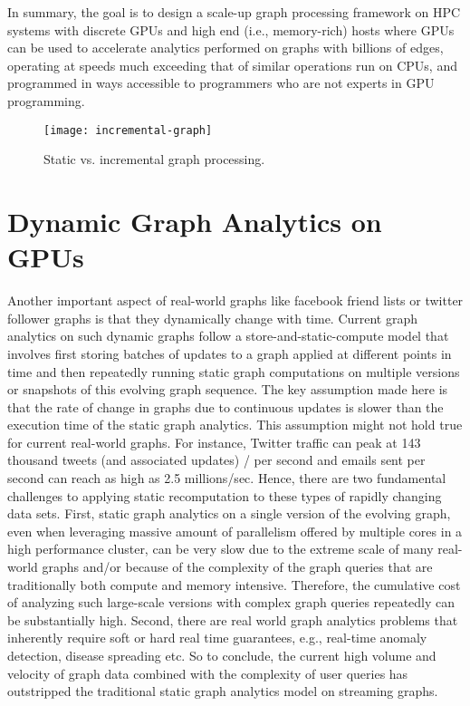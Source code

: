 In summary, the goal is to  design a scale-up graph processing framework on HPC systems with discrete GPUs and high end (i.e., memory-rich) hosts where GPUs can be used to accelerate analytics performed on graphs with billions of edges, operating at speeds much exceeding that of similar operations run on CPUs, and programmed in ways accessible to programmers who are not experts in GPU programming. 

\begin{figure}[t]
\begin{center}
\texttt{[image: incremental-graph]}
\caption{Static vs. incremental graph processing. }
\label{fig:inc}
\end{center}	
\end{figure}

\section{Dynamic Graph Analytics on GPUs}
Another important aspect of real-world graphs like facebook friend lists or twitter follower graphs is that they dynamically change with time.  Current graph analytics on such dynamic graphs follow a store-and-static-compute model that involves first storing batches of updates to a graph applied at different points in time and then repeatedly running static graph computations on multiple versions or snapshots of this evolving graph sequence. The key assumption made here is that the rate of change in graphs due to continuous updates is slower than the execution time of the static graph analytics. This assumption might not hold true for current real-world graphs. For instance, Twitter traffic can peak at 143 thousand tweets (and associated updates) / per second and emails sent per second can reach as high as 2.5 millions/sec.   Hence, there are two fundamental challenges to applying static recomputation to these types of rapidly changing data sets. First, static graph analytics on a single version of the evolving graph, even when leveraging massive amount of parallelism offered by multiple cores in a high performance cluster, can be very slow due to the extreme scale of many real-world graphs and/or because of the complexity of the graph queries that are traditionally both compute and memory intensive. Therefore, the cumulative cost of analyzing such large-scale versions with complex graph queries repeatedly can be substantially high. Second, there are real world graph analytics problems that inherently require soft or hard real time guarantees, e.g., real-time anomaly detection, disease spreading etc. So to conclude, the current high volume and velocity of graph data combined with the complexity of user queries has outstripped the traditional static graph analytics model on streaming graphs.


